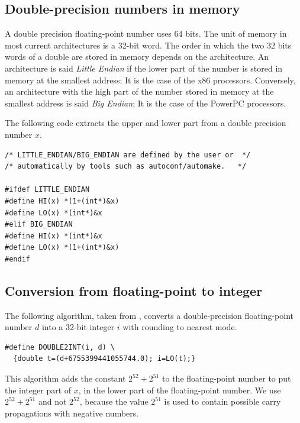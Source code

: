 \subsection{Double-precision numbers in memory\label{section:memory}}

A double precision floating-point number uses $64$ bits. The unit of memory in most current
architectures is a 32-bit word. The
order in which the two $32$ bits words of a double are stored in memory  depends on
the architecture. An architecture is said \emph{Little Endian} if the
lower part of the number is stored in memory at the smallest address;
It is the case of the x86 processors. Conversely, an architecture
with the high part of the number stored in memory at the smallest
address is said \emph{Big Endian}; It is the case of the PowerPC
processors.


The following code extracts the upper and lower part from a double
precision number $x$.

\begin{lstlisting}[label={chap0:lst:endian},
  caption={Extract upper and lower part of a double precision number $x$},firstnumber=1]
/* LITTLE_ENDIAN/BIG_ENDIAN are defined by the user or  */
/* automatically by tools such as autoconf/automake.   */

#ifdef LITTLE_ENDIAN
#define HI(x) *(1+(int*)&x)
#define LO(x) *(int*)&x
#elif BIG_ENDIAN
#define HI(x) *(int*)&x
#define LO(x) *(1+(int*)&x)
#endif
\end{lstlisting}



\subsection{Conversion from floating-point to integer \label{sec:double2int}}

\begin{theorem}
  The following algorithm, taken from \cite{AMDoptim2001}, converts a
  double-precision floating-point number $d$ into a 32-bit
  integer $i$ with rounding to nearest mode.
\begin{lstlisting}[label={chap0:lst:conversion2},caption={Conversion from FP to int},firstnumber=1]
#define DOUBLE2INT(i, d) \
  {double t=(d+6755399441055744.0); i=LO(t);}
\end{lstlisting}
\end{theorem}
This algorithm adds the constant $2^{52}+2^{51}$ to the floating-point
number to put the integer part of $x$, in the lower part of the
floating-point number.  We use $2^{52}+2^{51}$ and not $2^{52}$,
because the value $2^{51}$ is used to contain possible carry
propagations with negative numbers.



